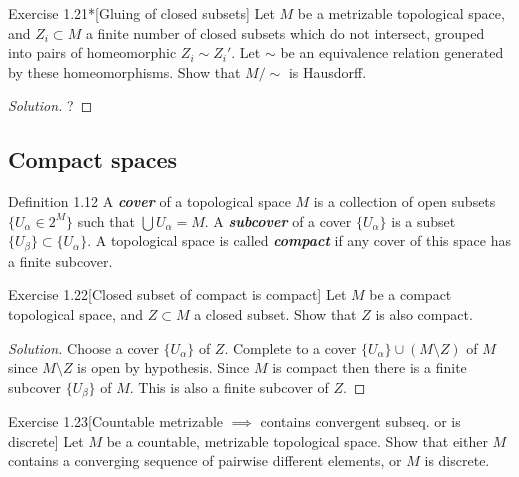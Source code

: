 \begin{thing4}{Exercise 1.21*}[Gluing of closed subsets]\label{exer:1.21}\leavevmode
Let $M$ be a metrizable topological space, and $Z_i \subset M$ a finite number of closed subsets which do not intersect, grouped into pairs of homeomorphic $Z_i \sim Z_i'$. Let $\sim$ be an equivalence relation generated by these homeomorphisms. Show that $M/\sim$ is Hausdorff.
\end{thing4}

\begin{proof}[Solution]\leavevmode
{\color{2}?}
\end{proof}

\subsection{Compact spaces}

\begin{thing3}{Definition 1.12}\leavevmode
	A \textit{\textbf{cover}} of a topological space $M$ is a collection of open subsets $\{U_\alpha \in 2^M\}$ such that $\bigcup U_\alpha=M $. A \textit{\textbf{subcover}} of a cover $\{U_\alpha\}$ is a subset $\{U_\beta\}\subset \{U_\alpha\}$. A topological space is called \textit{\textbf{compact}} if any cover of this space has a finite subcover.
\end{thing3}

\begin{thing4}{Exercise 1.22}[Closed subset of compact is compact]\label{exer:1.22}\leavevmode
	Let $M$ be a compact topological space, and $Z \subset M$ a closed subset. Show that $Z$ is also compact.
\end{thing4}

\begin{proof}[Solution]\leavevmode
Choose a cover $\{U_\alpha\}$ of $Z$. Complete to a cover $\{U_\alpha\}\cup (M\setminus Z)$ of $M$ since $M\setminus Z$ is open by hypothesis. Since $M$ is compact then there is a finite subcover $\{U_\beta\}$ of $M$. This is also a finite subcover of $Z$.
\end{proof}

\begin{thing4}{Exercise 1.23}[Countable metrizable $\implies $ contains convergent subseq. or is discrete]\label{exer:1.23}\leavevmode
	Let $M$ be a countable, metrizable topological space. Show that either $M$ contains a converging sequence of pairwise different elements, or $M$ is discrete.
\end{thing4}

